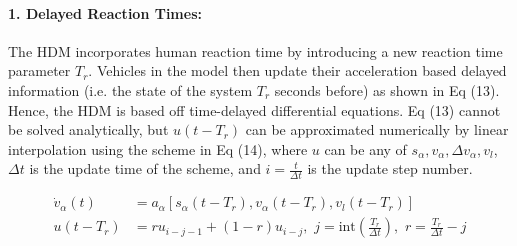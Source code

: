\documentclass[12pt]{article}
\begin{document}
\paragraph{1. Delayed Reaction Times:}
The HDM incorporates human reaction time by introducing a new reaction time parameter $T_r$.  Vehicles in the model then update their acceleration based delayed information (i.e. the state of the system $T_r$ seconds before) as shown in Eq (13).  Hence, the HDM is based off time-delayed differential equations.  Eq (13) cannot be solved analytically, but $u(t-T_r)$ can be approximated numerically by linear interpolation using the scheme in Eq (14), where $u$ can be any of $s_\alpha,v_\alpha,\Delta v_\alpha,v_l$, $\Delta t$ is the update time of the scheme, and $i=\frac{t}{\Delta t}$ is the update step number.
\begin{mymathbox}[ams gather, title=Delayed Reaction Time Equations Equations,colframe=blue!30!black]
  \begin{align}
  \dot{v}_\alpha(t) &= a_{\alpha}\left[s_\alpha(t-T_r), v_\alpha(t-T_r), v_l(t-T_r) \right]\\
  u(t-T_r) &= ru_{i-j-1} + (1-r)u_{i-j},  \, \, j = \textrm{int}\left(\frac{T_r}{\Delta t} \right), \, \, r = \frac{T_r}{\Delta t} - j
  \end{align}
\end{mymathbox}
\end{document}

